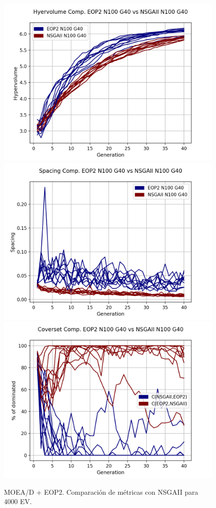 \begin{figure}[H]
\includegraphics[scale=0.35]{../METRICS_PLOTS/Hypervol_COMP_EOP2N100G40_NSGAIIN100G40.png}
\includegraphics[scale=0.35]{../METRICS_PLOTS/Spacing_COMP_EOP2N100G40_NSGAIIN100G40.png}
\includegraphics[scale=0.35]{../METRICS_PLOTS/CoverSet_COMP_EOP2N100G40_NSGAIIN100G40.png}\\
\caption{MOEA/D + EOP2. Comparación de métricas con NSGAII para 4000 EV.}
\label{fig:17}
\end{figure}
